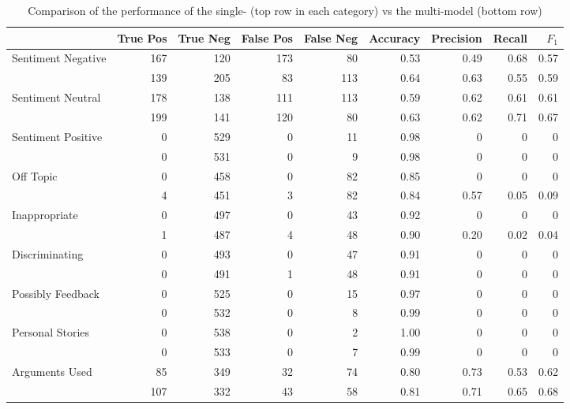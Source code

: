 \documentclass[11pt,a4paper]{article}
\begin{document}
\begin{table}
	\centering\scriptsize
	\begin{tabular}{l r r r r r r r r}
		& True Pos & True Neg & False Pos & False Neg & Accuracy & Precision & Recall & $F_1$ \\
		\hline
		Sentiment Negative & 167 & 120 & 173 & 80 & 0.53 & 0.49 & 0.68 & 0.57 \\
		& 139 & 205 & 83 & 113 & 0.64 & 0.63 & 0.55 & 0.59 \\
		\hline
		Sentiment Neutral & 178 & 138 & 111 & 113 & 0.59 & 0.62 & 0.61 & 0.61 \\
		& 199 & 141 & 120 & 80 & 0.63 & 0.62 & 0.71 & 0.67 \\
		\hline
		Sentiment Positive & 0 & 529 & 0 & 11 & 0.98 & 0 & 0 & 0 \\
		& 0 & 531 & 0 & 9 & 0.98 & 0 & 0 & 0 \\
		\hline
		Off Topic & 0 & 458 & 0 & 82 & 0.85 & 0 & 0 & 0 \\
		& 4 & 451 & 3 & 82 & 0.84 & 0.57 & 0.05 & 0.09 \\
		\hline
		Inappropriate & 0 & 497 & 0 & 43 & 0.92 & 0 & 0 & 0 \\
		& 1 & 487 & 4 & 48 & 0.90 & 0.20 & 0.02 & 0.04 \\
		\hline
		Discriminating & 0 & 493 & 0 & 47 & 0.91 & 0 & 0 & 0 \\
		& 0 & 491 & 1 & 48 & 0.91 & 0 & 0 & 0 \\
		\hline
		Possibly Feedback & 0 & 525 & 0 & 15 & 0.97 & 0 & 0 & 0 \\
		& 0 & 532 & 0 & 8 & 0.99 & 0 & 0 & 0 \\
		\hline
		Personal Stories & 0 & 538 & 0 & 2 & 1.00 & 0 & 0 & 0 \\
		& 0 & 533 & 0 & 7 & 0.99 & 0 & 0 & 0 \\
		\hline
		Arguments Used & 85 & 349 & 32 & 74 & 0.80 & 0.73 & 0.53 & 0.62 \\
		& 107 & 332 & 43 & 58 & 0.81 & 0.71 & 0.65 & 0.68 \\
	\end{tabular}
	\caption{Comparison of the performance of the single- (top row in each category) vs the multi-model (bottom row)}
	\label{tab:results}
\end{table}
\end{document}
